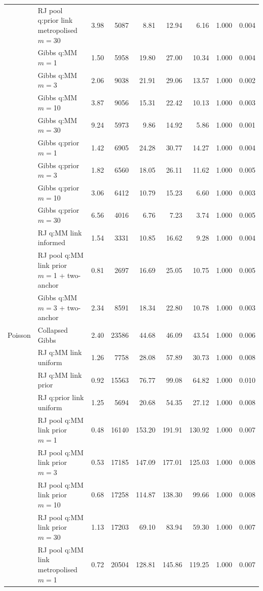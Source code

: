 \begin{tabular}{ll rrrrrrr}
 & RJ pool q:prior link metropolised $m=$30 & 3.98 & 5087 & 8.81 & 12.94 & 6.16 & 1.000 & 0.004 \\
 & Gibbs q:MM $m=$1 & 1.50 & 5958 & 19.80 & 27.00 & 10.34 & 1.000 & 0.004 \\
 & Gibbs q:MM $m=$3 & 2.06 & 9038 & 21.91 & 29.06 & 13.57 & 1.000 & 0.002 \\
 & Gibbs q:MM $m=$10 & 3.87 & 9056 & 15.31 & 22.42 & 10.13 & 1.000 & 0.003 \\
 & Gibbs q:MM $m=$30 & 9.24 & 5973 & 9.86 & 14.92 & 5.86 & 1.000 & 0.001 \\
 & Gibbs q:prior $m=$1 & 1.42 & 6905 & 24.28 & 30.77 & 14.27 & 1.000 & 0.004 \\
 & Gibbs q:prior $m=$3 & 1.82 & 6560 & 18.05 & 26.11 & 11.62 & 1.000 & 0.005 \\
 & Gibbs q:prior $m=$10 & 3.06 & 6412 & 10.79 & 15.23 & 6.60 & 1.000 & 0.003 \\
 & Gibbs q:prior $m=$30 & 6.56 & 4016 & 6.76 & 7.23 & 3.74 & 1.000 & 0.005 \\
 & RJ q:MM link informed & 1.54 & 3331 & 10.85 & 16.62 & 9.28 & 1.000 & 0.004 \\
 & RJ pool q:MM link prior $m=$1 + two-anchor & 0.81 & 2697 & 16.69 & 25.05 & 10.75 & 1.000 & 0.005 \\
 & Gibbs q:MM $m=$3 + two-anchor & 2.34 & 8591 & 18.34 & 22.80 & 10.78 & 1.000 & 0.003 \\
\addlinespace
Poisson & Collapsed Gibbs & 2.40 & 23586 & 44.68 & 46.09 & 43.54 & 1.000 & 0.006 \\
 & RJ q:MM link uniform & 1.26 & 7758 & 28.08 & 57.89 & 30.73 & 1.000 & 0.008 \\
 & RJ q:MM link prior & 0.92 & 15563 & 76.77 & 99.08 & 64.82 & 1.000 & 0.010 \\
 & RJ q:prior link uniform & 1.25 & 5694 & 20.68 & 54.35 & 27.12 & 1.000 & 0.008 \\
 & RJ pool q:MM link prior $m=$1 & 0.48 & 16140 & 153.20 & 191.91 & 130.92 & 1.000 & 0.007 \\
 & RJ pool q:MM link prior $m=$3 & 0.53 & 17185 & 147.09 & 177.01 & 125.03 & 1.000 & 0.008 \\
 & RJ pool q:MM link prior $m=$10 & 0.68 & 17258 & 114.87 & 138.30 & 99.66 & 1.000 & 0.008 \\
 & RJ pool q:MM link prior $m=$30 & 1.13 & 17203 & 69.10 & 83.94 & 59.30 & 1.000 & 0.007 \\
 & RJ pool q:MM link metropolised $m=$1 & 0.72 & 20504 & 128.81 & 145.86 & 119.25 & 1.000 & 0.007 \\

\end{tabular}
